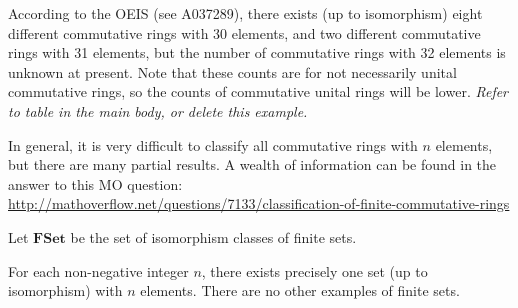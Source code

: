 \documentclass[a4paper]{article}
\begin{document}
\begin{example}
According to the OEIS (see A037289), there exists (up to isomorphism) eight different commutative rings with 30 elements, and two different commutative rings with 31 elements, but the number of commutative rings with 32 elements is unknown at present. Note that these counts are for not necessarily unital commutative rings, so the counts of commutative unital rings will be lower. \emph{Refer to table in the main body, or delete this example.}
\end{example}

In general, it is very difficult to classify all commutative rings with $n$ elements, but there are many partial results. A wealth of information can be found in the answer to this MO question:
\url{http://mathoverflow.net/questions/7133/classification-of-finite-commutative-rings}



\begin{definition}
Let $\mathbf{FSet}$ be the set of isomorphism classes of finite sets.
\end{definition}

\begin{example}
For each non-negative integer $n$, there exists precisely one set (up to isomorphism) with $n$ elements. There are no other examples of finite sets.
\end{example}






\end{document}
